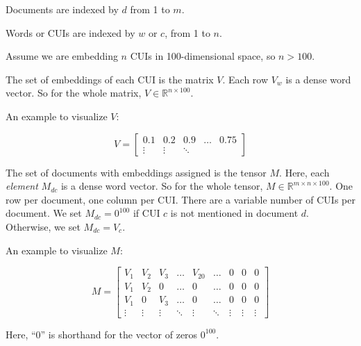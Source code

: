 \documentclass{article}
\begin{document}
Documents are indexed by $d$ from 1 to $m$.

Words or CUIs are indexed by $w$ or $c$, from 1 to $n$.

Assume we are embedding $n$ CUIs in 100-dimensional space, so $n > 100$.

The set of embeddings of each CUI is the matrix $V$. Each row $V_w$ is
a dense word vector. So for the whole matrix, $V \in \mathbb{R}^{n
  \times 100}$.

An example to visualize $V$:

\begin{equation}
  V = \left[
      \begin{array}{ccccc}
        0.1 & 0.2 & 0.9 & \ldots & 0.75 \\
        \vdots & \vdots & \ddots
      \end{array} \right]
\end{equation}

The set of documents with embeddings assigned is the tensor $M$. Here,
each \emph{element} $M_{dc}$ is a dense word vector. So for the whole
tensor, $M \in \mathbb{R}^{m \times n \times 100}$. One row per
document, one column per CUI. There are a variable number of CUIs per
document. We set $M_{dc} = 0^{100}$ if CUI $c$ is not mentioned in
document $d$. Otherwise, we set $M_{dc} = V_c$.

An example to visualize $M$:

\begin{equation}
  M = \left[
      \begin{array}{ccccccccc}
        V_1 & V_2 & V_3 & \ldots & V_{20} & \ldots & 0 & 0 & 0 \\
        V_1 & V_2 & 0   & \ldots & 0      & \ldots & 0 & 0 & 0 \\
        V_1 & 0   & V_3 & \ldots & 0      & \ldots & 0 & 0 & 0 \\
        \vdots & \vdots & \vdots & \ddots & \vdots & \ddots & \vdots & \vdots & \vdots
      \end{array} \right]
\end{equation}

Here, ``0'' is shorthand for the vector of zeros $0^{100}$.
\end{document}
